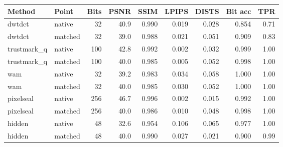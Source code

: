 \begin{tabular}{llrrrrrrr}
\toprule
Method & Point & Bits & PSNR & SSIM & LPIPS & DISTS & Bit acc & TPR \\
\midrule
dwtdct & native & 32 & 40.9 & 0.990 & 0.019 & 0.028 & 0.854 & 0.71 \\
dwtdct & matched & 32 & 39.0 & 0.988 & 0.021 & 0.051 & 0.909 & 0.83 \\
trustmark\_q & native & 100 & 42.8 & 0.992 & 0.002 & 0.032 & 0.999 & 1.00 \\
trustmark\_q & matched & 100 & 40.0 & 0.985 & 0.005 & 0.052 & 0.998 & 1.00 \\
wam & native & 32 & 39.2 & 0.983 & 0.034 & 0.058 & 1.000 & 1.00 \\
wam & matched & 32 & 40.0 & 0.985 & 0.030 & 0.052 & 1.000 & 1.00 \\
pixelseal & native & 256 & 46.7 & 0.996 & 0.002 & 0.015 & 0.992 & 1.00 \\
pixelseal & matched & 256 & 40.0 & 0.986 & 0.010 & 0.048 & 0.998 & 1.00 \\
hidden & native & 48 & 32.6 & 0.954 & 0.106 & 0.065 & 0.977 & 1.00 \\
hidden & matched & 48 & 40.0 & 0.990 & 0.027 & 0.021 & 0.900 & 0.99 \\
\bottomrule
\end{tabular}
